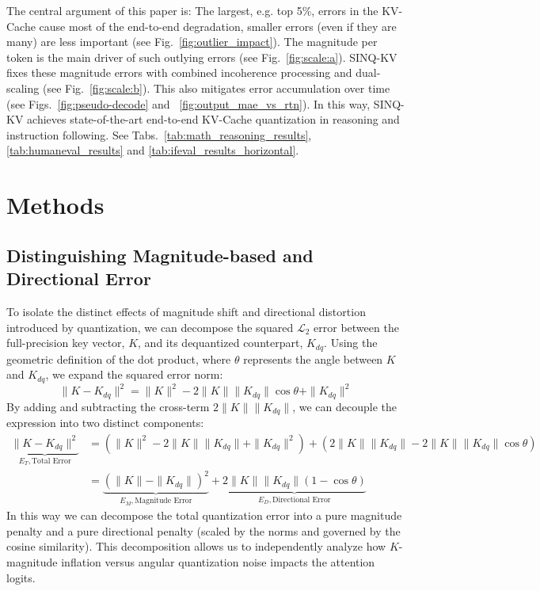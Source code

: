 \documentclass{llmxive}
\providecommand{\methodname}{SINQ-KV\xspace}
\begin{document}
The central argument of this paper is:  The largest, e.g. top 5\%, errors in the KV-Cache cause most of the end-to-end degradation, smaller errors (even if they are many) are less important (see Fig.~\ref{fig:outlier_impact}). The magnitude per token is the main driver of such outlying errors (see Fig.~\ref{fig:scale:a}). \methodname fixes these magnitude errors with combined incoherence processing and dual-scaling (see Fig.~\ref{fig:scale:b}). This also mitigates error accumulation over time (see Figs.~\ref{fig:pseudo-decode} and ~\ref{fig:output_mae_vs_rtn}). In this way, \methodname achieves state-of-the-art end-to-end KV-Cache quantization in reasoning and instruction following. See Tabs.~\ref{tab:math_reasoning_results}, \ref{tab:humaneval_results} and \ref{tab:ifeval_results_horizontal}.


\section{Methods}

\subsection{Distinguishing Magnitude-based and Directional Error}
To isolate the distinct effects of magnitude shift and directional distortion introduced by quantization, we can decompose the squared $\mathcal{L}_2$ error between the full-precision key vector, $K$, and its dequantized counterpart, $K_{dq}$. Using the geometric definition of the dot product, where $\theta$ represents the angle between $K$ and $K_{dq}$, we expand the squared error norm:
\begin{equation}
    \|K - K_{dq}\|^2 = \|K\|^2 - 2\|K\|\|K_{dq}\|\cos\theta + \|K_{dq}\|^2
\end{equation}
By adding and subtracting the cross-term $2\|K\|\|K_{dq}\|$, we can decouple the expression into two distinct components:
\begin{align}
    \underbrace{\|K - K_{dq}\|^2}_{E_T, \text{Total Error}} &= \left( \|K\|^2 - 2\|K\|\|K_{dq}\| + \|K_{dq}\|^2 \right) + \left( 2\|K\|\|K_{dq}\| - 2\|K\|\|K_{dq}\|\cos\theta \right) \nonumber \\
    &= \underbrace{\left( \|K\| - \|K_{dq}\| \right)^2}_{E_M, \text{Magnitude Error}} + \underbrace{2\|K\|\|K_{dq}\|(1 - \cos\theta)}_{E_D, \text{Directional Error}}
    \label{eq:decompose}
\end{align}
In this way we can decompose the total quantization error into a pure magnitude penalty and a pure directional penalty (scaled by the norms and governed by the cosine similarity). This decomposition allows us to independently analyze how $K$-magnitude inflation versus angular quantization noise impacts the attention logits.
\end{document}
